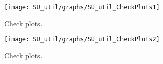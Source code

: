  
\begin{figure}[H]
\centering 
\texttt{[image: SU\_util/graphs/SU\_util\_CheckPlots1]}
\caption{Check plots.}\label{Fig:CheckPlots:1}
\end{figure}
 
\begin{figure}[H]
\centering 
\texttt{[image: SU\_util/graphs/SU\_util\_CheckPlots2]}
\caption{Check plots.}\label{Fig:CheckPlots:2}
\end{figure}
 
